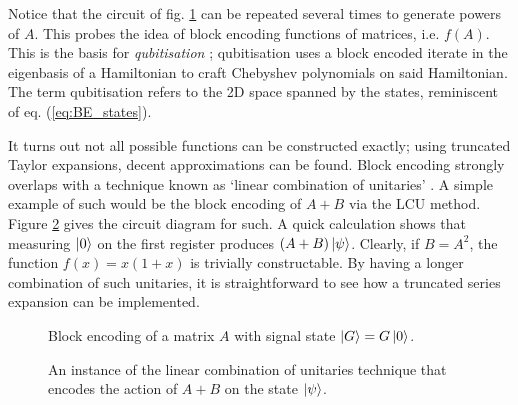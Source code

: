 \documentclass{article}
\begin{document}
Notice that the circuit of fig. \ref{fig:BE_A} can be repeated several times to generate powers of $A$. This probes the idea of block encoding functions of matrices, i.e. $f(A)$. This is the basis for \emph{qubitisation} \cite{LC19}; qubitisation uses a block encoded iterate in the eigenbasis of a Hamiltonian to craft Chebyshev polynomials on said Hamiltonian. The term qubitisation refers to the 2D space spanned by the states, reminiscent of eq. (\ref{eq:BE_states}).

It turns out not all possible functions can be constructed exactly; using truncated Taylor expansions, decent approximations can be found. Block encoding strongly overlaps with a technique known as `linear combination of unitaries' \cite{CW12}. A simple example of such would be the block encoding of $A + B$ via the \textsc{LCU} method. Figure \ref{fig:LCU} gives the circuit diagram for such. A quick calculation shows that measuring $\ket{0}$ on the first register produces $(A+B)\ket{\psi}$. Clearly, if $B=A^2$, the function $f(x)=x(1+x)$ is trivially constructable. By having a longer combination of such unitaries, it is straightforward to see how a truncated series expansion can be implemented.

\begin{figure}[!ht]
    \centering
    \caption{Block encoding of a matrix $A$ with signal state $\ket{G} = G\ket{0}$.}
    \label{fig:BE_A}
\end{figure}

\begin{figure}[!ht]
    \centering
    \caption{An instance of the linear combination of unitaries technique that encodes the action of $A+B$ on the state $\ket{\psi}$.}
    \label{fig:LCU}
\end{figure}
\end{document}
